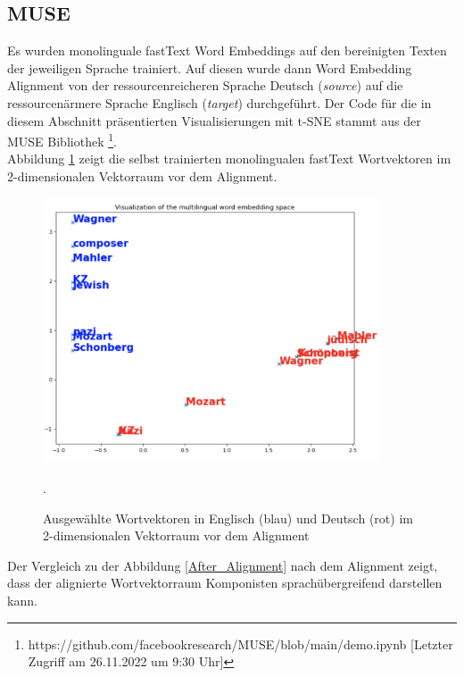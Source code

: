 \documentclass[ngerman]{ttlab-qualify}
\begin{document}
\subsection{MUSE}
Es wurden monolinguale fastText Word Embeddings auf den bereinigten Texten der jeweiligen Sprache trainiert. Auf diesen wurde dann Word Embedding Alignment von der ressourcenreicheren Sprache Deutsch (\textit{source}) auf die ressourcenärmere Sprache Englisch (\textit{target}) durchgeführt. Der Code für die in diesem Abschnitt präsentierten Visualisierungen mit t-SNE stammt aus der MUSE Bibliothek \footnote{https://github.com/facebookresearch/MUSE/blob/main/demo.ipynb [Letzter Zugriff am 26.11.2022 um 9:30 Uhr]}.\\ 
Abbildung \ref{Before_Alignment} zeigt die selbst trainierten monolingualen fastText Wortvektoren im 2-dimensionalen Vektorraum vor dem Alignment.
\begin{figure}[H]
\begin{center}
\includegraphics[width=10cm]{grafiken/before_alignment.png}
\caption[Ausgewählte Wortvektoren in Englisch und Deutsch im 2-dimensionalen Vektorraum vor dem Alignment]{Ausgewählte Wortvektoren in Englisch (blau) und Deutsch (rot) im 2-dimensionalen Vektorraum vor dem Alignment}.
\label{Before_Alignment} 
\end{center}
\end{figure} 
\noindent Der Vergleich zu der Abbildung \ref{After_Alignment} nach dem Alignment zeigt, dass der alignierte Wortvektorraum Komponisten sprachübergreifend darstellen kann.
\end{document}
